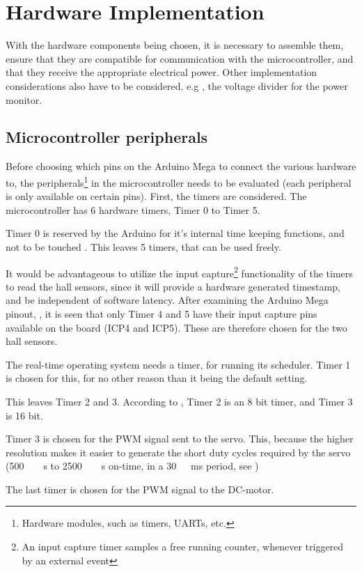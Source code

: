 \section{Hardware Implementation}
With the hardware components being chosen, it is necessary to assemble them, ensure that they are compatible for communication with the microcontroller, and that they receive the appropriate electrical power. Other implementation considerations also have to be considered. e.g , the voltage divider for the power monitor.
\subsection{Microcontroller peripherals}
Before choosing which pins on the Arduino Mega to connect the various hardware to, the peripherals\footnote{Hardware modules, such as timers, UARTs, etc.} in the microcontroller needs to be evaluated (each peripheral is only available on certain pins). First, the timers are considered. The microcontroller has 6 hardware timers, Timer 0 to Timer 5.

Timer 0 is reserved by the Arduino for it's internal time keeping functions, and not to be touched \cite{ArduinoPWM}. This leaves 5 timers, that can be used freely.

It would be advantageous to utilize the input capture\footnote{An input capture timer samples a free running counter, whenever triggered by  an external event} functionality of the timers to read the hall sensors, since it will provide a hardware generated timestamp, and be independent of software latency. After examining the Arduino Mega pinout, , it is seen that only Timer 4 and 5 have their input capture pins available on the board (ICP4 and ICP5). These are therefore chosen for the two hall sensors.
   
The real-time operating system needs a timer, for running its scheduler. Timer 1 is chosen for this, for no other reason than it being the default setting.

This leaves Timer 2 and 3. According to \cite{Atmega}, Timer 2 is an 8 bit timer, and Timer 3 is 16 bit. 

Timer 3 is chosen for the PWM signal sent to the servo. This, because the higher resolution makes it easier to generate the short duty cycles required by the servo (\si{500\ \mu s} to \si{2500\ \mu s} on-time, in a \si{30\ ms} period, see )

The last timer is chosen for the PWM signal to the DC-motor.

